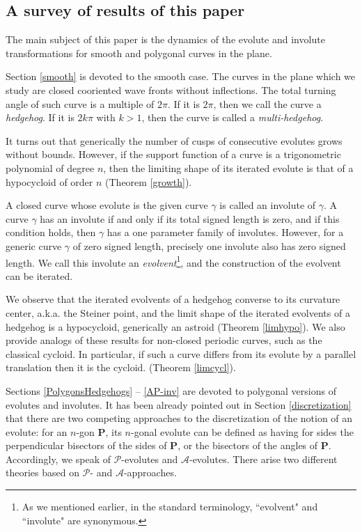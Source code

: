 \documentclass[12pt]{article}
\newcommand{\Pev}{\mathcal{P}}
\newcommand{\Aev}{\mathcal{A}}
\renewcommand{\P}{\mathbf{P}}
\begin{document}
\subsection{A survey of results of this paper}\label{survey}

The main subject of this paper is the dynamics of the evolute and involute transformations for smooth and polygonal curves in the plane.

Section \ref{smooth} is devoted to the smooth case. The curves in the plane which we study are closed cooriented wave fronts without inflections. The total turning angle of such curve is a multiple of $2\pi$. If it is $2\pi$, then we call the curve a {\it hedgehog}. If it is $2k\pi$ with $k>1$, then the curve is called a {\it multi-hedgehog}. 

It turns out that generically the number of cusps of consecutive evolutes grows without bounds. However, if the support function of a curve is a trigonometric polynomial of degree $n$, then the limiting shape of its iterated evolute is that of a hypocycloid of order $n$ (Theorem \ref{growth}).

A closed curve whose evolute is the given curve $\gamma$  is called an involute of $\gamma$. A curve $\gamma$ has an involute if and only if its total signed length is zero, and if this condition holds, then $\gamma$ has a one parameter family of involutes. However, for a generic curve $\gamma$ of zero signed length, precisely one involute also has  zero signed length. We call this involute an {\it evolvent}\footnote{As we mentioned earlier, in the standard terminology, ``evolvent" and ``involute" are synonymous.}, and the construction of the evolvent can be iterated. 

We observe that the iterated evolvents of a hedgehog converse to its curvature center, a.k.a. the Steiner point, and the limit shape of the iterated evolvents of a hedgehog is a hypocycloid, generically an astroid (Theorem \ref{limhypo}). We also provide analogs of these results for non-closed periodic curves, such as the classical cycloid. In particular, if such a curve differs  from its evolute by a parallel translation then it is the cycloid. (Theorem \ref{limcycl}).

Sections \ref{PolygonsHedgehogs} -- \ref{AP-inv} are devoted to polygonal versions of evolutes and involutes. It has been already pointed out in Section  \ref{discretization} that there are two competing approaches to the discretization of the notion of an evolute: for an $n$-gon $\P$, its $n$-gonal evolute can be defined as having for sides the perpendicular bisectors of the sides of $\P$, or the bisectors of the angles of $\P$. Accordingly, we speak of $\Pev$-evolutes and $\Aev$-evolutes. There arise two different theories based on $\Pev$- and $\Aev$-approaches. 
\end{document}
